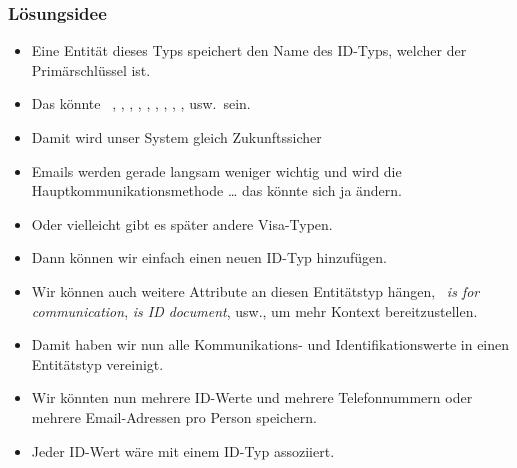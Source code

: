 \documentclass[aspectratio=169,mathserif,notheorems]{beamer}%
\begin{document}
\begin{frame}%
\frametitle{Lösungsidee}%
\begin{itemize}%
%
%
\item<2-> Eine Entität dieses Typs speichert den Name des ID-Typs, welcher der Primärschlüssel ist.%
%
\item<3-> Das könnte \DEzB\ , , ,  , , , , , , usw.\ sein.%
%
\item<4-> Damit wird unser System gleich Zukunftssicher%
%
\item<5-> Emails werden gerade langsam weniger wichtig und  wird die Hauptkommunikationsmethode {\dots} das könnte sich ja ändern.%
%
\item<6-> Oder vielleicht gibt es später andere Visa-Typen.%
%
\item<7-> Dann können wir einfach einen neuen ID-Typ hinzufügen.%
%
\item<8-> Wir können auch weitere Attribute an diesen Entitätstyp hängen, \DEzB\ \emph{is for communication}, \emph{is ID document}, usw., um mehr Kontext bereitzustellen.%
%
\item<9-> Damit haben wir nun alle Kommunikations- und Identifikationswerte in einen Entitätstyp vereinigt.%
%
\item<10-> Wir könnten nun mehrere ID-Werte und mehrere Telefonnummern oder mehrere Email-Adressen pro Person speichern.%
%
\item<11-> Jeder ID-Wert wäre mit einem ID-Typ assoziiert.%
\end{itemize}%
\end{frame}%
%
\end{document}
